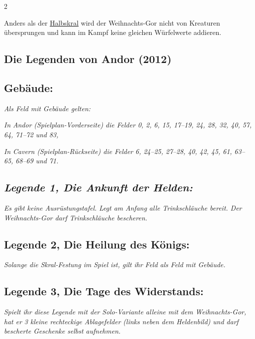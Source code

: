\documentclass[10pt, a4paper, oneside]{book}
\newcommand{\fan}[1]{\textit{#1}}
\begin{document}
\begin{multicols*}{2}
\begin{nobgcolor}
Anders als der \hyperref[Halbskral]{Halbskral} wird der Weihnachts-Gor nicht von Kreaturen übersprungen und kann im Kampf keine gleichen Würfelwerte addieren.







\end{nobgcolor}


\begin{bgcolor}
\section{Die Legenden von Andor (2012)}

\subsection{Gebäude:}

\fan{Als Feld mit Gebäude gelten:}

\bullet{} \fan{In Andor (Spielplan-Vorderseite) die Felder 0, 2, 6, 15, 17–19, 24, 28, 32, 40, 57, 64, 71–72 und 83,}

\bullet{} \fan{In Cavern (Spielplan-Rückseite) die Felder 6, 24–25, 27–28, 40, 42, 45, 61, 63–65, 68–69 und 71.}


\subsection{\fan{Legende 1, Die Ankunft der Helden:}}

\fan{Es gibt keine Ausrüstungstafel. Legt am Anfang alle Trinkschläuche bereit. Der Weihnachts-Gor darf Trinkschläuche bescheren.}




\subsection{Legende 2, Die Heilung des Königs:}


\fan{Solange die Skral-Festung im Spiel ist, gilt ihr Feld als Feld mit Gebäude.}


\subsection{Legende 3, Die Tage des Widerstands:}

\fan{Spielt ihr diese Legende mit der Solo-Variante alleine mit dem Weihnachts-Gor, hat er 3 kleine rechteckige Ablagefelder (links neben dem Heldenbild) und darf bescherte Geschenke selbst aufnehmen.}



\end{bgcolor}
\end{multicols*}
\end{document}
